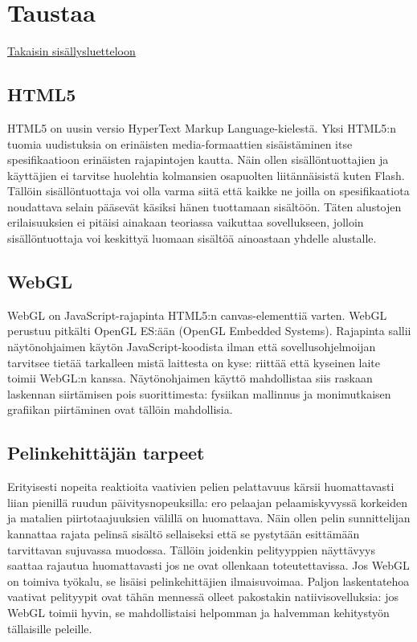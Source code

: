 \section{Taustaa}
\label{sec:taustaa}
\hyperlink{index}{Takaisin sisällysluetteloon}

\subsection{HTML5}
HTML5 on uusin versio HyperText Markup Language-kielestä. Yksi HTML5:n tuomia uudistuksia on erinäisten media-formaattien sisäistäminen itse spesifikaatioon erinäisten rajapintojen kautta\hyperlink{}{\cite{html5diff}}. Näin ollen sisällöntuottajien ja käyttäjien ei tarvitse huolehtia kolmansien osapuolten liitännäisistä kuten Flash. Tällöin sisällöntuottaja voi olla varma siitä että kaikke ne joilla on spesifikaatiota noudattava selain pääsevät käsiksi hänen tuottamaan sisältöön. Täten alustojen erilaisuuksien ei pitäisi ainakaan teoriassa vaikuttaa sovellukseen, jolloin sisällöntuottaja voi keskittyä luomaan sisältöä ainoastaan yhdelle alustalle.

\subsection{WebGL}
WebGL on JavaScript-rajapinta HTML5:n canvas-elementtiä varten. WebGL perustuu pitkälti OpenGL ES:ään (OpenGL Embedded Systems)\hyperlink{}{\cite{webgl_specification}}. Rajapinta sallii näytönohjaimen käytön JavaScript-koodista ilman että sovellusohjelmoijan tarvitsee tietää tarkalleen mistä laittesta on kyse: riittää että kyseinen laite toimii WebGL:n kanssa\hyperlink{}{\cite{webgl_supported}}. Näytönohjaimen käyttö mahdollistaa siis raskaan laskennan siirtämisen pois suorittimesta: fysiikan mallinnus ja monimutkaisen grafiikan piirtäminen ovat tällöin mahdollisia.

\subsection{Pelinkehittäjän tarpeet}
Erityisesti nopeita reaktioita vaativien pelien pelattavuus kärsii huomattavasti liian pienillä ruudun päivitysnopeuksilla: ero pelaajan pelaamiskyvyssä korkeiden ja matalien piirtotaajuuksien välillä on huomattava\hyperlink{}{\cite{claypool_fps}}. Näin ollen pelin sunnittelijan kannattaa rajata pelinsä sisältö sellaiseksi että se pystytään esittämään tarvittavan sujuvassa muodossa. Tällöin joidenkin pelityyppien näyttävyys saattaa rajautua huomattavasti jos ne ovat ollenkaan toteutettavissa. Jos WebGL on toimiva työkalu, se lisäisi pelinkehittäjien ilmaisuvoimaa. Paljon laskentatehoa vaativat pelityypit ovat tähän mennessä olleet pakostakin natiivisovelluksia: jos WebGL toimii hyvin, se mahdollistaisi helpomman ja halvemman kehitystyön tällaisille peleille.